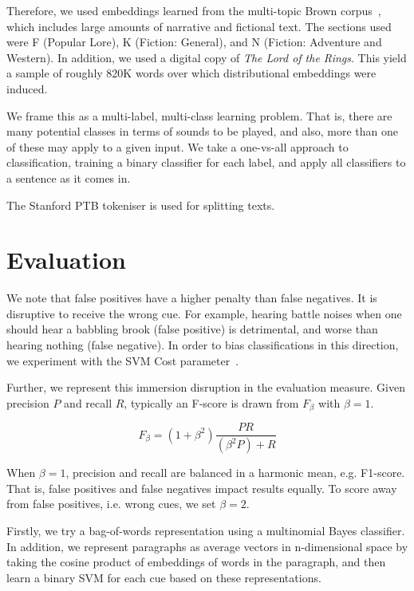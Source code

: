\documentclass[10pt,a4paper]{article}
\begin{document}
Therefore, we used embeddings learned from the multi-topic Brown corpus~\cite{francis1979brown}, which includes large amounts of narrative and fictional text.
The sections used were F (Popular Lore), K (Fiction: General), and N (Fiction: Adventure and Western).
In addition, we used a digital copy of {\em The Lord of the Rings}.
This yield a sample of roughly 820K words over which distributional embeddings were induced.

We frame this as a multi-label, multi-class learning problem.
That is, there are many potential classes in terms of sounds to be played, and also, more than one of these may apply to a given input.
We take a one-vs-all approach to classification, training a binary classifier for each label, and apply all classifiers to a sentence as it comes in.

The Stanford PTB tokeniser is used for splitting texts.

\section{Evaluation}

We note that false positives have a higher penalty than false negatives.
It is disruptive to receive the wrong cue.
For example, hearing battle noises when one should hear a babbling brook (false positive) is detrimental, and worse than hearing nothing (false negative).
In order to bias classifications in this direction, we experiment with the SVM Cost parameter~\cite{morik1999combining}.

Further, we represent this immersion disruption in the evaluation measure.
Given precision $P$ and recall $R$, typically an F-score is drawn from $F_\beta$ with $\beta=1$.

\begin{equation}
F_\beta = (1+\beta^2)\frac{PR}{(\beta^2 P) + R} 
\end{equation}

When $\beta=1$, precision and recall are balanced in a harmonic mean, e.g. F1-score.
That is, false positives and false negatives impact results equally.
To score away from false positives, i.e. wrong cues, we set $\beta=2$.

Firstly, we try a bag-of-words representation using a multinomial Bayes classifier.
In addition, we represent paragraphs as average vectors in n-dimensional space by taking the cosine product of embeddings of words in the paragraph, and then learn a binary SVM for each cue based on these representations.
\end{document}

